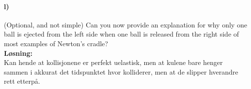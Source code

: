 \documentclass[11pt, A4paper,norsk]{article}
\begin{document}
		\paragraph{l)}
			\begin{flushleft}
(Optional, and not simple) Can you now provide an explanation for why only one ball is ejected from the left side when one ball is released from the right side of most examples of Newton’s cradle? \\
\vspace{1mm}
\textbf{Løsning:} \\
\vspace{1mm}
Kan hende at kollisjonene er perfekt uelastisk, men at kulene bare henger sammen i akkurat det tidspunktet hvor kolliderer, men at de slipper hverandre rett etterpå.
			\end{flushleft}
\end{document}
